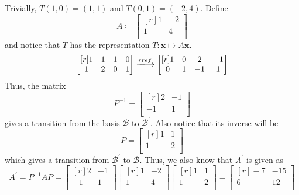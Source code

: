 \documentclass{article}
\theoremstyle{definition}
\newenvironment{solution}[1][]{\begin{replacementsoln}}{\end{replacementsoln}}
\begin{document}
\begin{solution}
  Trivially, \(T(1,0)=(1,1)\) and \(T(0,1)=(-2,4)\). Define
  \[
    A \coloneqq \begin{bmatrix}[r]
      1 & -2  \\
      1 &4   \\
    \end{bmatrix}
  \]
  and notice that \(T\) has the representation \(T:\mathbf{x}\mapsto A \mathbf{x}\).
  \[
    \begin{bmatrix}[r]
      1 &1  &1  &0   \\
       1&2  &0  &1   \\
    \end{bmatrix}\xlongrightarrow{rref} \begin{bmatrix}[r]
      1 &0  &2  &-1   \\
       0&1  &-1  &1   \\
    \end{bmatrix}
  \]
  Thus, the matrix
  \[
    P ^{-1} =\begin{bmatrix}[r]
      2 &-1   \\
       -1&   1\\
    \end{bmatrix}
  \]
  gives a transition from the basis \(\mathcal{B} \) to \(\mathcal{B} ^{\prime} \). Also notice that its inverse will be
  \[
    P=\begin{bmatrix}[r]
      1 &1   \\
       1&2   \\
    \end{bmatrix}
  \]
  which gives a transition from \(\mathcal{B} ^{\prime} \) to \(\mathcal{B} \). Thus, we also know that \(A^{\prime} \) is given as
  \[
    A^{\prime} =P ^{-1} AP = \begin{bmatrix}[r]
      2 &-1   \\
       -1&   1\\
    \end{bmatrix}\begin{bmatrix}[r]
      1 & -2  \\
      1 &4   \\
    \end{bmatrix}\begin{bmatrix}[r]
      1 &1   \\
       1&2   \\
    \end{bmatrix} = \begin{bmatrix}[r]
      -7 &-15   \\
       6&12   \\

\end{bmatrix}\]
\end{solution}
\end{document}
